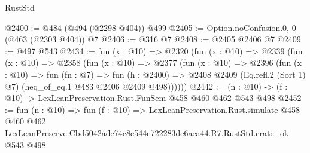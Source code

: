 \begin{lexlean}{RustStd}
\begin{coremodule}
@2400 := @484 (@494 (@2298 @404)) @499
@2405 := Option.noConfusion.{0, 0} (@463 (@2303 @404)) @7
@2406 := @316 @7
@2408 := @2405 @2406 @7
@2409 := @497 @543
@2434 := fun (x : @10) =>
  @2320
    (fun (x : @10) =>
    @2339
      (fun (x : @10) =>
      @2358
        (fun (x : @10) =>
        @2377
          (fun (x : @10) =>
          @2396
            (fun (x : @10) =>
            fun (fn : @7) =>
            fun (h : @2400) =>
            @2408 @2409 (Eq.refl.{2} (Sort 1) @7) (heq_of_eq.{1} @483 @2406 @2409 @498))))))
@2442 := (n : @10) -> (f : @10) -> LexLeanPreservation.Rust.FunSem @458 @460 @462 @543 @498
@2452 := fun (n : @10) =>
  fun (f : @10) =>
  LexLeanPreservation.Rust.simulate
    @458
    @460
    @462
    LexLeanPreserve.Cbd5042ade74c8e544e722283de6aea44.R7.RustStd.crate_ok
    @543
    @498
\end{coremodule}
\end{lexlean}
